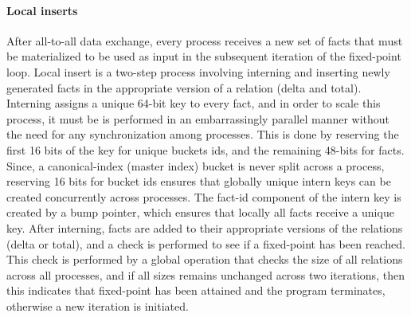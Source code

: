 \paragraph*{Local inserts}
After all-to-all data exchange, every process receives a new set of facts that must be materialized to be used as input in the subsequent iteration of the fixed-point loop. Local insert is a two-step process involving interning and inserting newly generated facts in the appropriate version of a relation (delta and total). Interning assigns a unique 64-bit key to every fact, and in order to scale this process, it must be is performed in an embarrassingly parallel manner without the need for any synchronization among processes. This is done by reserving the first 16 bits of the key for unique buckets ids, and the remaining 48-bits for facts. Since, a canonical-index (master index) bucket is never split across a process, reserving 16 bits for bucket ids ensures that globally unique intern keys can be created concurrently across processes. The fact-id component of the intern key is created by a bump pointer, which ensures that locally all facts receive a unique key. After interning, facts are added to their appropriate versions of the relations (delta or total), and a check is performed to see if a fixed-point has been reached. This check is performed by a global operation that checks the size of all relations across all processes, and if all sizes remains unchanged across two iterations, then this indicates that fixed-point has been attained and the program terminates, otherwise a new iteration is initiated.
